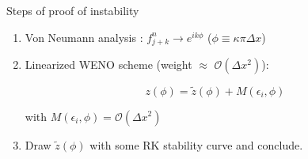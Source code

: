 \documentclass{beamer}
\begin{document}
  \begin{frame}{Steps of proof of instability}

    \begin{enumerate}
      \item Von Neumann analysis : $f_{j+k}^n \rightarrow e^{ik\phi}$ ($\phi \equiv \kappa\pi\Delta x$)
      \item Linearized WENO scheme (weight $\approx$ $\mathcal{O}(\Delta x^2)$):

        $$
          z(\phi) = \tilde{z}(\phi) + M(\epsilon_i,\phi)
        $$

        with $M(\epsilon_i,\phi) = \mathcal{O}(\Delta x^2)$
      \item Draw $\tilde{z}(\phi)$ with some RK stability curve and conclude.
    \end{enumerate}
  \end{frame}
\end{document}
